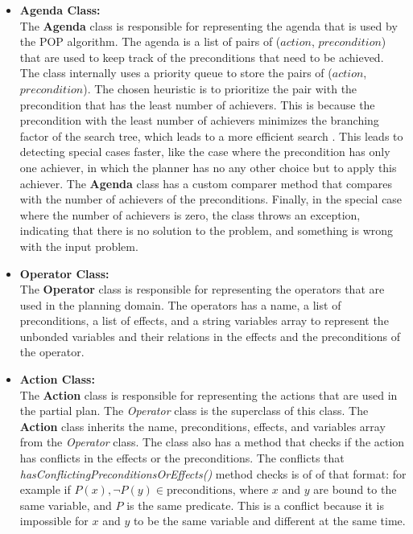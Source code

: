\begin{itemize}
    \item \textbf{Agenda Class:} \\
          The \textbf{Agenda} class is responsible for representing the agenda that is used by the \ac{POP} algorithm. The agenda is a list of pairs of ($action$, $precondition$) that are used to keep track of the preconditions that need to be achieved. The class internally uses a priority queue to store the pairs of ($action$, $precondition$). The chosen heuristic is to prioritize the pair with the precondition that has the least number of achievers. This is because the precondition with the least number of achievers minimizes the branching factor of the search tree, which leads to a more efficient search \cite{RN2020_Ch.11}. This leads to detecting special cases faster, like the case where the precondition has only one achiever, in which the planner has no any other choice but to apply this achiever. The \textbf{Agenda} class has a custom comparer method that compares with the number of achievers of the preconditions. Finally, in the special case where the number of achievers is zero, the class throws an exception, indicating that there is no solution to the problem, and something is wrong with the input problem.

    \item \textbf{Operator Class:} \\
          The \textbf{Operator} class is responsible for representing the operators that are used in the planning domain. The operators has a name, a list of preconditions, a list of effects, and a string variables array to represent the unbonded variables and their relations in the effects and the preconditions of the operator.

    \item \textbf{Action Class:} \\
          The \textbf{Action} class is responsible for representing the actions that are used in the partial plan. The \textit{Operator} class is the superclass of this class. The \textbf{Action} class inherits the name, preconditions, effects, and variables array from the \textit{Operator} class. The class also has a method that checks if the action has conflicts in the effects or the preconditions. The conflicts that \textit{hasConflictingPreconditionsOrEffects()} method checks is of of that format: for example if $P(x), \lnot P(y) \in \text{preconditions}$, where $x$ and $y$ are bound to the same variable, and $P$ is the same predicate. This is a conflict because it is impossible for $x$ and $y$ to be the same variable and different at the same time.


\end{itemize}
